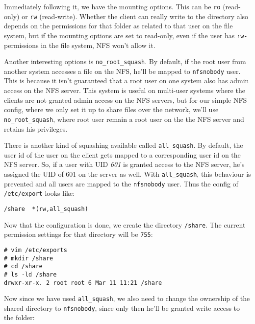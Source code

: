 Immediately following it, we have the mounting options. This can be \verb|ro| (read-only) or \verb|rw| (read-write). Whether the client can really write to the directory also depends on the permissions for that folder as related to that user on the file system, but if the mounting options are set to read-only, even if the user has \verb|rw-| permissions in the file system, NFS won't allow it.

Another interesting options is \verb|no_root_squash|. By default, if the root user from another system accesses a file on the NFS, he'll be mapped to \verb|nfsnobody| user. This is because it isn't guaranteed that a root user on one system also has admin access on the NFS server. This system is useful on multi-user systems where the clients are not granted admin access on the NFS servers, but for our simple NFS config, where we only set it up to share files over the network, we'll use \verb|no_root_squash|, where root user remain a root user on the the NFS server and retains his privileges. 

There is another kind of squashing available called \verb|all_squash|. By default, the user id of the user on the client gets mapped to a corresponding user id on the NFS server. So, if a user with UID \textit{601} is granted access to the NFS server, he's assigned the UID of 601 on the server as well. With \verb|all_squash|, this behaviour is prevented and all users are mapped to the \verb|nfsnobody| user. Thus the config of \verb|/etc/export| looks like:

\vspace{-15pt}
\begin{verbatim}
/share	*(rw,all_squash)
\end{verbatim}
\vspace{-10pt}	

\noindent
Now that the configuration is done, we create the directory \verb|/share|. The current permission settings for that directory will be \verb|755|:

\vspace{-15pt}
\begin{verbatim}
# vim /etc/exports
# mkdir /share
# cd /share
# ls -ld /share
drwxr-xr-x. 2 root root 6 Mar 11 11:21 /share
\end{verbatim}
\vspace{-10pt}	

\noindent
Now since we have used \verb|all_squash|, we also need to change the ownership of the shared directory to \verb|nfsnobody|, since only then he'll be granted write access to the folder:

